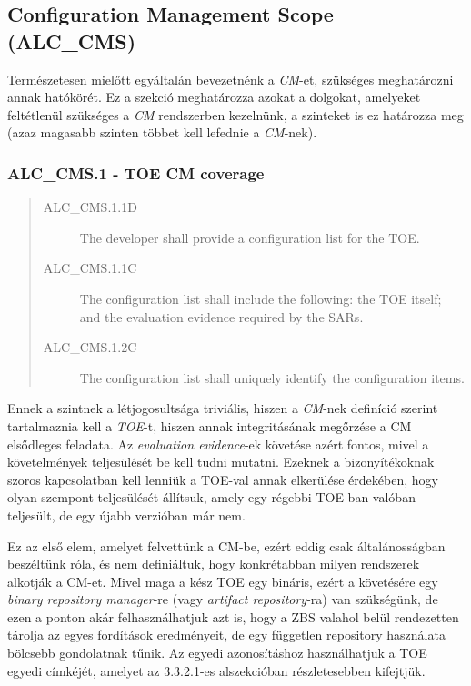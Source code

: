 \subsection{Configuration Management Scope (ALC\_CMS)}
Természetesen mielőtt egyáltalán bevezetnénk a \emph{CM}-et, szükséges meghatározni annak hatókörét.
Ez a szekció meghatározza azokat a dolgokat, amelyeket feltétlenül szükséges a \emph{CM} rendszerben
kezelnünk, a szinteket is ez határozza meg (azaz magasabb szinten többet kell lefednie
a \emph{CM}-nek).

\pagebreak[3]
\subsubsection{ALC\_CMS.1 - TOE CM coverage}
\begin{quote}
    \begin{description}
        \item[ALC\_CMS.1.1D]{The developer shall provide a configuration list for the TOE.}
        \item[ALC\_CMS.1.1C]{The configuration list shall include the following: the TOE itself; and
            the evaluation evidence required by the SARs.}
        \item[ALC\_CMS.1.2C]{The configuration list shall uniquely identify the configuration
            items.}
    \end{description}
\end{quote}

Ennek a szintnek a létjogosultsága triviális, hiszen a \emph{CM}-nek definíció szerint tartalmaznia
kell a \emph{TOE}-t, hiszen annak integritásának megőrzése a CM elsődleges feladata. Az
\emph{evaluation evidence}-ek követése azért fontos, mivel a követelmények teljesülését be kell
tudni mutatni. Ezeknek a bizonyítékoknak szoros kapcsolatban kell lenniük a TOE-val annak elkerülése
érdekében, hogy olyan szempont teljesülését állítsuk, amely egy régebbi TOE-ban valóban teljesült,
de egy újabb verzióban már nem.

Ez az első elem, amelyet felvettünk a CM-be, ezért eddig csak általánosságban beszéltünk róla, és
nem definiáltuk, hogy konkrétabban milyen rendszerek alkotják a CM-et.  Mivel maga a kész TOE egy
bináris, ezért a követésére egy \emph{binary repository manager}-re (vagy \emph{artifact
repository}-ra) van szükségünk, de ezen a ponton akár felhasználhatjuk azt is, hogy a ZBS valahol
belül rendezetten tárolja az egyes fordítások eredményeit, de egy független repository használata
bölcsebb gondolatnak tűnik.  Az egyedi azonosításhoz használhatjuk a TOE egyedi címkéjét, amelyet az
3.3.2.1-es alszekcióban részletesebben kifejtjük.

